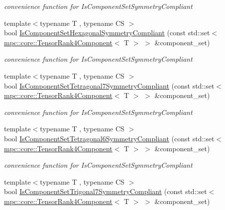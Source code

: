 \begin{DoxyCompactItemize}
\begin{DoxyCompactList}\small\item\em convenience function for Is\+Component\+Set\+Symmetry\+Compliant \end{DoxyCompactList}\item 
{\footnotesize template$<$typename T , typename CS $>$ }\\bool \mbox{\hyperlink{namespacempc_1_1core_a5fba223541d3c2615a86a32de49e1bc4}{Is\+Component\+Set\+Hexagonal\+Symmetry\+Compliant}} (const std\+::set$<$ \mbox{\hyperlink{namespacempc_1_1core_ac3a232afc7c680d580628e834030482f}{mpc\+::core\+::\+Tensor\+Rank4\+Component}}$<$ T $>$ $>$ \&component\+\_\+set)
\begin{DoxyCompactList}\small\item\em convenience function for Is\+Component\+Set\+Symmetry\+Compliant \end{DoxyCompactList}\item 
{\footnotesize template$<$typename T , typename CS $>$ }\\bool \mbox{\hyperlink{namespacempc_1_1core_a92e4483941bd929b5081ebcec09dec55}{Is\+Component\+Set\+Tetragonal7\+Symmetry\+Compliant}} (const std\+::set$<$ \mbox{\hyperlink{namespacempc_1_1core_ac3a232afc7c680d580628e834030482f}{mpc\+::core\+::\+Tensor\+Rank4\+Component}}$<$ T $>$ $>$ \&component\+\_\+set)
\begin{DoxyCompactList}\small\item\em convenience function for Is\+Component\+Set\+Symmetry\+Compliant \end{DoxyCompactList}\item 
{\footnotesize template$<$typename T , typename CS $>$ }\\bool \mbox{\hyperlink{namespacempc_1_1core_a3310295841e3459b8259d4f4976e0758}{Is\+Component\+Set\+Tetragonal6\+Symmetry\+Compliant}} (const std\+::set$<$ \mbox{\hyperlink{namespacempc_1_1core_ac3a232afc7c680d580628e834030482f}{mpc\+::core\+::\+Tensor\+Rank4\+Component}}$<$ T $>$ $>$ \&component\+\_\+set)
\begin{DoxyCompactList}\small\item\em convenience function for Is\+Component\+Set\+Symmetry\+Compliant \end{DoxyCompactList}\item 
{\footnotesize template$<$typename T , typename CS $>$ }\\bool \mbox{\hyperlink{namespacempc_1_1core_af046341a578d766d11560ed1b6f35ff8}{Is\+Component\+Set\+Trigonal7\+Symmetry\+Compliant}} (const std\+::set$<$ \mbox{\hyperlink{namespacempc_1_1core_ac3a232afc7c680d580628e834030482f}{mpc\+::core\+::\+Tensor\+Rank4\+Component}}$<$ T $>$ $>$ \&component\+\_\+set)

\end{DoxyCompactItemize}
